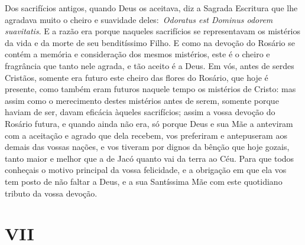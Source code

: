 Dos sacrifícios antigos, quando Deus os aceitava, diz a
Sagrada Escritura que lhe agradava muito o cheiro e suavidade
deles:~\emph{Odoratus est Dominus odorem suavitatis}.
E a razão era porque naqueles sacrifícios se representavam os mistérios
da vida e da morte de seu benditíssimo Filho. E como na devoção do
Rosário se contém a memória e consideração dos mesmos mistérios, este é
o cheiro e fragrância que tanto nele agrada, e tão aceito é a Deus. Em
vós, antes de serdes Cristãos, somente era futuro este cheiro das flores
do Rosário, que hoje é presente, como também eram futuros naquele tempo
os mistérios de Cristo: mas assim como o merecimento destes mistérios
antes de serem, somente porque haviam de ser, davam eficácia àqueles
sacrifícios; assim a vossa devoção do Rosário futura, e quando ainda não
era, só porque Deus e sua Mãe a anteviram com a aceitação e agrado que
dela recebem, vos preferiram e antepuseram aos demais das vossas nações,
e vos tiveram por dignos da bênção que hoje gozais, tanto maior e melhor
que a de Jacó quanto vai da terra ao Céu. Para que todos conheçais o
motivo principal da vossa felicidade, e a obrigação em que ela vos tem
posto de não faltar a Deus, e a sua Santíssima Mãe com este quotidiano
tributo da vossa devoção.


\section{VII}

